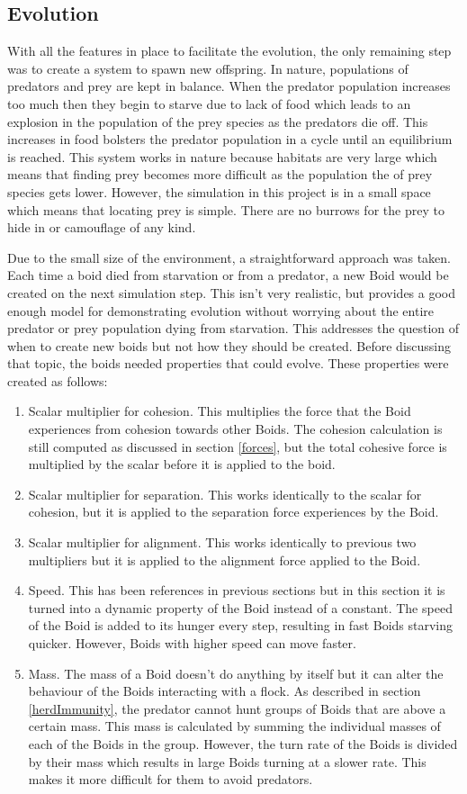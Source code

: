 \documentclass{egpubl}
\begin{document}
\subsection{Evolution}
With all the features in place to facilitate the evolution, the only remaining step was to create a system to spawn new offspring. In nature, populations of predators and prey are kept in balance. When the predator population increases too much then they begin to starve due to lack of food which leads to an explosion in the population of the prey species as the predators die off. This increases in food bolsters the predator population in a cycle until an equilibrium is reached. This system works in nature because habitats are very large which means that finding prey becomes more difficult as the population the of prey species gets lower. However, the simulation in this project is in a small space which means that locating prey is simple. There are no burrows for the prey to hide in or camouflage of any kind. 
\par
Due to the small size of the environment, a straightforward approach was taken. Each time a boid died from starvation or from a predator, a new Boid would be created on the next simulation step. This isn't very realistic, but provides a good enough model for demonstrating evolution without worrying about the entire predator or prey population dying from starvation. This addresses the question of when to create new boids but not how they should be created. Before discussing that topic, the boids needed properties that could evolve. These properties were created as follows:
\begin{enumerate}
    \item Scalar multiplier for cohesion. This multiplies the force that the Boid experiences from cohesion towards other Boids. The cohesion calculation is still computed as discussed in section \ref{forces}, but the total cohesive force is multiplied by the scalar before it is applied to the boid.
    \item Scalar multiplier for separation. This works identically to the scalar for cohesion, but it is applied to the separation force experiences by the Boid.
    \item Scalar multiplier for alignment. This works identically to previous two multipliers but it is applied to the alignment force applied to the Boid.
    \item Speed. This has been references in previous sections but in this section it is turned into a dynamic property of the Boid instead of a constant. The speed of the Boid is added to its hunger every step, resulting in fast Boids starving quicker. However, Boids with higher speed can move faster.
    \item Mass. The mass of a Boid doesn't do anything by itself but it can alter the behaviour of the Boids interacting with a flock. As described in section \ref{herdImmunity}, the predator cannot hunt groups of Boids that are above a certain mass. This mass is calculated by summing the individual masses of each of the Boids in the group. However, the turn rate of the Boids is divided by their mass which results in large Boids turning at a slower rate. This makes it more difficult for them to avoid predators.
\end{enumerate}
\end{document}
